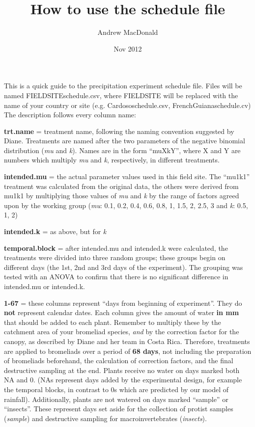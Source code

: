 \documentclass[12pt]{article}
\title{How to use the schedule file}
\author{Andrew MacDonald}
\date{Nov 2012}
\begin{document}
\maketitle


This is a quick guide to the precipitation experiment schedule
file. Files will be named FIELDSITEschedule.csv, where FIELDSITE will
be replaced with the name of your country or site
(e.g. Cardososchedule.csv, FrenchGuianaschedule.cv) The description
follows every column name:


\textbf{trt.name} = treatment name, following the naming convention
suggested by Diane.  Treatments are named after the two parameters of
the negative binomial distribution (\emph{mu} and \emph{k}).
Names are in the form ``muXkY'', where X and Y are numbers which
multiply \emph{mu} and \emph{k}, respectively, in different
treatments.

\textbf{intended.mu} = the actual parameter values used in this field
site. The ``mu1k1'' treatment was calculated from the original data,
the others were derived from mu1k1 by multiplying those values of
\emph{mu} and \emph{k} by the range of factors agreed upon by the
working group (\emph{mu}: 0.1, 0.2, 0.4, 0.6, 0.8, 1, 1.5, 2, 2.5, 3
and \emph{k}: 0.5, 1, 2)

\textbf{intended.k} = as above, but for \emph{k}

\textbf{temporal.block} = after intended.mu and intended.k were
calculated, the treatments were divided into three random groups;
these groups begin on different days (the 1st, 2nd and 3rd days of the
experiment).  The grouping was tested with an ANOVA to confirm that
there is no significant difference in intended.mu or intended.k.

\textbf{1-67} = these columns represent ``days from beginning of
experiment''. They do \textbf{not} represent calendar dates.  Each
column gives the amount of water \textbf{in mm} that should be added
to each plant.  Remember to multiply these by the catchment area of
your bromeliad species, \emph{and} by the correction factor for the
canopy, as described by Diane and her team in Costa Rica.  Therefore,
treatments are applied to bromeliads over a period of \textbf{68
  days}, not including the preparation of bromeliads beforehand, the
calculation of correction factors, and the final destructive sampling
at the end.  Plants receive no water on days marked both NA and 0.
(NAs represent days added by the experimental design, for example the
temporal blocks, in contrast to 0s which are predicted by our model of
rainfall).  Additionally, plants are not watered on days marked
``sample'' or ``insects''.  These represent days set aside for the
collection of protist samples (\emph{sample}) and destructive sampling for
macroinvertebrates (\emph{insects}).
\end{document}
